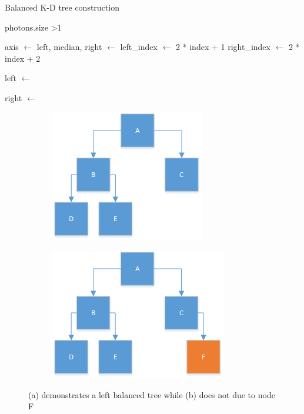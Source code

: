 \begin{algorithm}
\begin{algorithmic}
\caption{Balanced K-D tree construction}
\If
{
photons.size \textgreater 1
}
{
	\State axis $\gets$ 
	\State left, median, right $\gets$ 
	\State left\_index  $\gets$ 2 * index + 1
	\State right\_index $\gets$ 2 * index + 2

		\State left $\gets$ 
	\EndIf

		\State right $\gets$ 
	\EndIf

}
\Else
{

}
\EndIf
\EndFunction
%
%
%
%
%
%
%
%

\end{algorithmic}
\end{algorithm}

\begin{figure}
\centering
\begin{subfigure}{0.4\textwidth}
\includegraphics[scale=0.8]{./images/left-balanced-tree.png}
\caption{}
\end{subfigure}
\begin{subfigure}{0.4\textwidth}
\includegraphics[scale=0.8]{./images/non-left-balanced-tree.png}
\caption{}
\end{subfigure}
\caption{(a) demonstrates a left balanced tree while (b) does not due to node F}
\end{figure}

